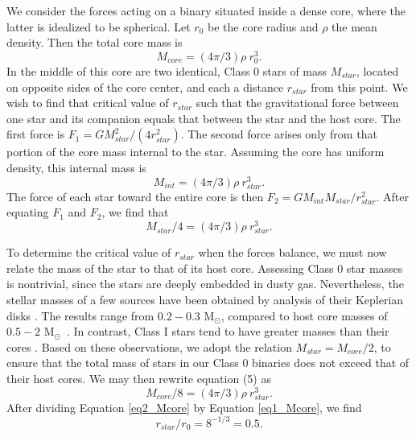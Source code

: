 \documentclass[usenatbib,a4paper]{mnras}
\newcommand{\Msun}{\mbox{M$_{\odot}$}}
\begin{document}
We consider the forces acting on a binary situated inside a dense core,  where the latter is idealized to be spherical. Let $r_0$ be the core radius and $\rho$ the mean density. Then the total core mass is
%
\begin{equation}\label{eq1_Mcore}
M_{core} = (4\pi/3)\rho\ r_0^3.
\end{equation}
%
In the middle of this core are two identical, Class 0 stars of mass $M_{star}$, located on opposite sides of the core center, and each a distance $r_{star}$ from this point. We wish to find that critical value of $r_{star}$ such that the gravitational force between one star and its companion equals that between the star and the host core.  The first force is $F_1 = G M_{star}^2 / (4 r_{star}^2)$.  The second force arises only from that portion of the core mass internal to the star. Assuming the core has uniform density, this internal mass is
%
\begin{equation}
M_{int} = (4\pi/3)\rho\ r_{star}^3.
\end{equation}
%
The force of each star toward the entire core is then $F_2 = G M_{int} M_{star} / r_{star}^2$. After equating $F_1$ and $F_2$, we find that
%
\begin{equation}
M_{star}/4 = (4\pi/3)\rho\ r_{star}^3.
\end{equation}

To determine the critical value of $r_{star}$ when the forces balance, we must now relate the mass of the star to that of its host core.  Assessing Class 0 star masses is nontrivial, since the stars are deeply embedded in dusty gas.  Nevertheless, the stellar masses of a few sources have been obtained by analysis of their Keplerian disks \citep{Tobin12,  Murillo13, Codella14, Yen16}.  The results range from $0.2 - 0.3$ \Msun, compared to host core masses of $0.5 - 2$ \Msun\ \citep[see aforementioned papers and][]{Miettinen10}.  In contrast, Class I stars tend to have greater masses than their cores \citep[][and references therein]{Chou14}.  Based on these observations, we adopt the relation $M_{star} = M_{core} / 2$, to ensure that the total mass of stars in our Class 0 binaries does not exceed that of their host cores. We may then rewrite equation (5) as
%
\begin{equation}\label{eq2_Mcore}
M_{core}/8 = (4\pi/3)\rho\ r_{star}^3.
\end{equation}
%
After dividing Equation \ref{eq2_Mcore} by Equation \ref{eq1_Mcore}, we find
\begin{equation}
r_{star}/r_0 = 8^{-1/3} = 0.5.
\end{equation}
\end{document}
